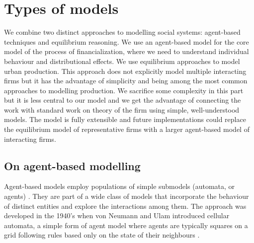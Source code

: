 



\section{Types of models}\label{sec-types}
We combine two distinct approaches to modelling social systems: agent-based techniques and equilibrium reasoning. We use an agent-based model for the core model of the process of financialization, where we need to understand individual behaviour and distributional effects.  We use equilibrium approaches to model urban production. This approach does not explicitly model multiple interacting firms but it has the advantage of simplicity and being among the most common approaches to modelling production. We sacrifice some complexity in this part but it is less central to our model and 
we get the advantage of connecting the work with standard work on theory of the firm using simple, well-understood models. The model is fully extensible and future implementations could replace the equilibrium model of representative firms with a larger agent-based model of interacting firms.

\subsection{On agent-based modelling}
Agent-based models employ populations of simple submodels (automata, or agents) \cite{shalizi_methods_2006}. They are part of a wide class of models that incorporate the behaviour of distinct entities and explore the interactions among them. The approach was developed in the 1940's when von Neumann and Ulam introduced cellular automata, a simple form of agent model where agents are typically squares on a grid following rules based only on the state of their neighbours \cite{banksStatisticalChallengesAgentBased2021}.

